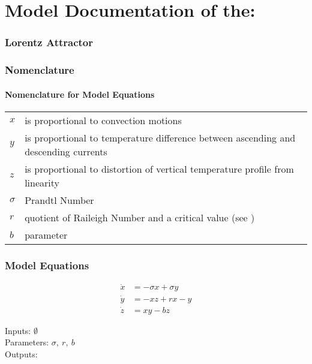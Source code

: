 \documentclass[10pt,a4paper]{article}
\begin{document}
	\part*{Model Documentation of the:}
	\section*{Lorentz Attractor} %
	
	
	\section{Nomenclature} %
	\subsection{Nomenclature for Model Equations} %
	
	\begin{tabular}{ll}
		$x$ & is proportional to convection motions \\
		$y$ & is proportional to temperature difference between ascending and descending currents\\
		$z$ & is proportional to distortion of vertical temperature profile from linearity\\
		$\sigma$ & Prandtl Number \\
		$r$ & quotient of Raileigh Number and a critical value (see \cite{LOR63})\\
		$b$ & parameter
	\end{tabular}
	
	
	
	\section{Model Equations} %
	
	\begin{subequations}
	\begin{align}
		\dot{x} &= -\sigma x + \sigma y 	\\      %
		\dot{y} &= -xz+rx-y 	\\
		\dot{z} &= xy - bz	
	\end{align}
	\end{subequations}

	\noindent
	Inputs: $\emptyset$ 
	\\
	Parameters: $\sigma,~r,~b$ %
	\\
	Outputs:  %
	
\end{document}
